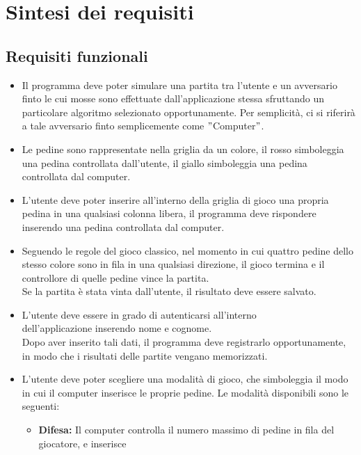 
\thispagestyle{headings}
\section{Sintesi dei requisiti}\label{sec:}

\subsection{Requisiti funzionali}\label{subsec:requisiti-funzionali}
\begin{itemize}
    \item Il programma deve poter simulare una partita tra l'utente e un avversario finto le cui mosse
    sono effettuate dall'applicazione stessa sfruttando un particolare algoritmo selezionato opportunamente.
    Per semplicità, ci si riferirà a tale avversario finto semplicemente come \("\)Computer\("\).
    \item Le pedine sono rappresentate nella griglia da un colore, il rosso simboleggia una pedina controllata
    dall'utente, il giallo simboleggia una pedina controllata dal computer.
    \item L'utente deve poter inserire all'interno della griglia di gioco una propria pedina in una qualsiasi colonna
    libera, il programma deve rispondere inserendo una pedina controllata dal computer.
    \item Seguendo le regole del gioco classico, nel momento in cui quattro pedine dello stesso colore sono in fila
    in una qualsiasi direzione, il gioco termina e il controllore di quelle pedine vince la partita. \\
    Se la partita è stata vinta dall'utente, il risultato deve essere salvato.
    \item L'utente deve essere in grado di autenticarsi all'interno \\dell'applicazione inserendo nome e cognome. \\
    Dopo aver inserito tali dati, il programma deve registrarlo opportunamente, in modo che i
    risultati delle partite vengano memorizzati.
    \item L'utente deve poter scegliere una modalità di gioco, che simboleggia il modo in cui il computer inserisce
    le proprie pedine.
    Le modalità disponibili sono le seguenti:
        \begin{itemize}
            \item \textbf{Difesa:} Il computer controlla il numero massimo di pedine in fila del giocatore, e inserisce

\end{itemize}
\end{itemize}
